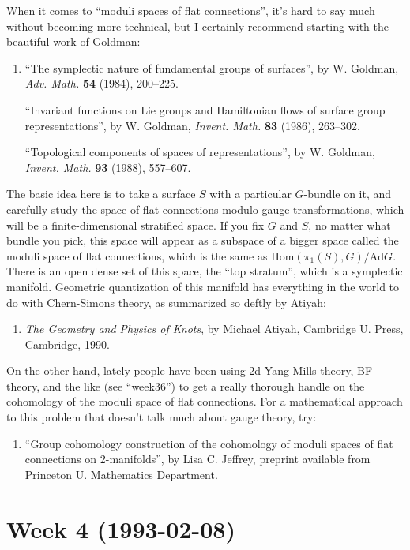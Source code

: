 \documentclass{article}
\def\tightlist{}
\begin{document}
When it comes to ``moduli spaces of flat connections'', it's hard to say
much without becoming more technical, but I certainly recommend starting
with the beautiful work of Goldman:

\begin{enumerate}
\def\labelenumi{\arabic{enumi})}
\setcounter{enumi}{3}
\item
  ``The symplectic nature of fundamental groups of surfaces'', by W.
  Goldman, \emph{Adv. Math.} \textbf{54} (1984), 200--225.

  ``Invariant functions on Lie groups and Hamiltonian flows of surface
  group representations'', by W. Goldman, \emph{Invent. Math.}
  \textbf{83} (1986), 263--302.

  ``Topological components of spaces of representations'', by W.
  Goldman, \emph{Invent. Math.} \textbf{93} (1988), 557--607.
\end{enumerate}

The basic idea here is to take a surface \(S\) with a particular
\(G\)-bundle on it, and carefully study the space of flat connections
modulo gauge transformations, which will be a finite-dimensional
stratified space. If you fix \(G\) and \(S\), no matter what bundle you
pick, this space will appear as a subspace of a bigger space called the
moduli space of flat connections, which is the same as
\(\mathrm{Hom}(\pi_1(S),G)/\mathrm{Ad} G\). There is an open dense set
of this space, the ``top stratum'', which is a symplectic manifold.
Geometric quantization of this manifold has everything in the world to
do with Chern-Simons theory, as summarized so deftly by Atiyah:

\begin{enumerate}
\def\labelenumi{\arabic{enumi})}
\setcounter{enumi}{4}
\tightlist
\item
  \emph{The Geometry and Physics of Knots}, by Michael Atiyah, Cambridge
  U. Press, Cambridge, 1990.
\end{enumerate}

On the other hand, lately people have been using 2d Yang-Mills theory,
BF theory, and the like (see ``week36'') to get a really thorough handle
on the cohomology of the moduli space of flat connections. For a
mathematical approach to this problem that doesn't talk much about gauge
theory, try:

\begin{enumerate}
\def\labelenumi{\arabic{enumi})}
\setcounter{enumi}{5}
\tightlist
\item
  ``Group cohomology construction of the cohomology of moduli spaces of
  flat connections on 2-manifolds'', by Lisa C. Jeffrey, preprint
  available from Princeton U. Mathematics Department.
\end{enumerate}
\hypertarget{week-4-1993-02-08}{%
\section{Week 4 (1993-02-08)}\label{week-4-1993-02-08}}
\end{document}
